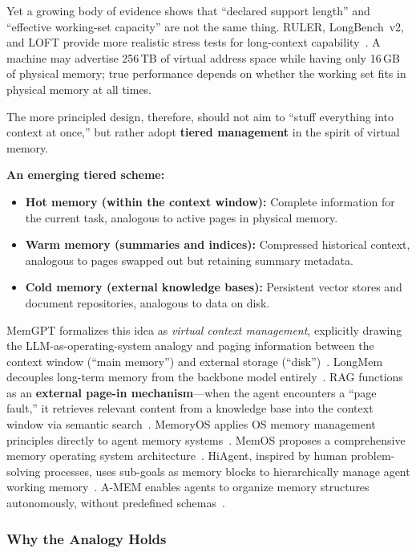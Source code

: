 \documentclass[11pt,a4paper]{article}
\begin{document}
Yet a growing body of evidence shows that ``declared support length'' and ``effective working-set capacity'' are not the same thing.
RULER, LongBench~v2, and LOFT provide more realistic stress tests for long-context capability~\cite{ruler2024,longbenchv2_2024,loft2024}.
A machine may advertise 256\,TB of virtual address space while having only 16\,GB of physical memory; true performance depends on whether the working set fits in physical memory at all times.

The more principled design, therefore, should not aim to ``stuff everything into context at once,'' but rather adopt \textbf{tiered management} in the spirit of virtual memory.

\textbf{An emerging tiered scheme:}
\begin{itemize}[nosep]
\item \textbf{Hot memory (within the context window):} Complete information for the current task, analogous to active pages in physical memory.
\item \textbf{Warm memory (summaries and indices):} Compressed historical context, analogous to pages swapped out but retaining summary metadata.
\item \textbf{Cold memory (external knowledge bases):} Persistent vector stores and document repositories, analogous to data on disk.
\end{itemize}

MemGPT formalizes this idea as \textit{virtual context management}, explicitly drawing the LLM-as-operating-system analogy and paging information between the context window (``main memory'') and external storage (``disk'')~\cite{memgpt2023}.
LongMem decouples long-term memory from the backbone model entirely~\cite{longmem2023}.
RAG functions as an \textbf{external page-in mechanism}---when the agent encounters a ``page fault,'' it retrieves relevant content from a knowledge base into the context window via semantic search~\cite{lewis2020rag}.
MemoryOS applies OS memory management principles directly to agent memory systems~\cite{memoryos2025}.
MemOS proposes a comprehensive memory operating system architecture~\cite{memos2025}.
HiAgent, inspired by human problem-solving processes, uses sub-goals as memory blocks to hierarchically manage agent working memory~\cite{hiagent2024}.
A-MEM enables agents to organize memory structures autonomously, without predefined schemas~\cite{amem2025}.

\subsubsection{Why the Analogy Holds}
\end{document}
